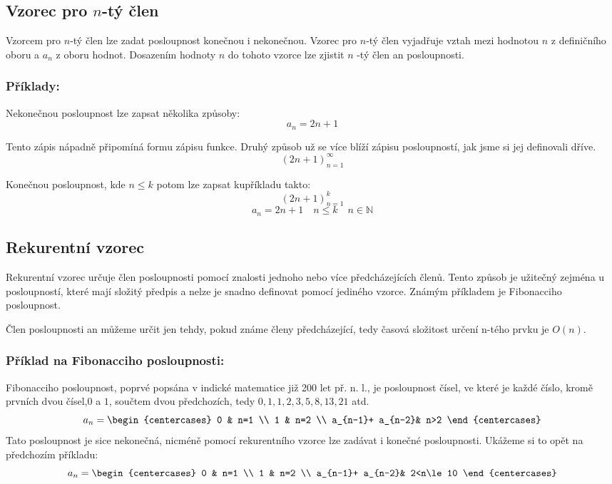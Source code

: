 \documentclass[12pt]{report}			%
\begin{document}
\subsection{Vzorec pro $n$-tý člen}
Vzorcem pro $n$-tý člen lze zadat posloupnost konečnou i nekonečnou.
Vzorec pro $n$-tý člen vyjadřuje vztah mezi hodnotou $n$ z definičního oboru a $a_n$ z oboru hodnot. Dosazením hodnoty $n$ do tohoto vzorce lze zjistit $n$ -tý člen an posloupnosti.
\subsubsection{Příklady:}
Nekonečnou posloupnost lze zapsat několika způsoby:
\[a_n = 2n + 1 \]

Tento zápis nápadně připomíná formu zápisu funkce. Druhý způsob už se více blíží zápisu posloupností, jak jsme si jej definovali dříve.
\[(2n + 1)_{n=1}^{\infty} \]

Konečnou posloupnost, kde $n \le k$ potom lze zapsat kupříkladu takto:
\[(2n + 1)_{n=1}^{k} \]
\[a_n = 2n + 1 \quad n \le k \quad n \in \mathbb{N}\]
\subsection{Rekurentní vzorec}
Rekurentní vzorec určuje člen posloupnosti pomocí znalosti jednoho nebo více předcházejících členů. Tento způsob je užitečný zejména u posloupností, které mají složitý předpis a nelze je snadno definovat pomocí jediného vzorce. Známým příkladem je Fibonacciho posloupnost.

Člen posloupnosti an můžeme určit jen tehdy, pokud známe členy předcházející, tedy časová složitost určení n-tého prvku je $O(n)$. 
\subsubsection{Příklad na Fibonacciho posloupnosti:}
Fibonacciho posloupnost, poprvé popsána v indické matematice již 200 let př. n. l., je posloupnost čísel, ve které je každé číslo, kromě prvních dvou čísel,$0$ a $1$, součtem dvou předchozích, tedy $0, 1, 1, 2, 3, 5, 8, 13, 21$ atd. 
\[
a_{n}=
\begin{centercases}
  0         & n=1 \\
  1 		   & n=2 \\
  a_{n-1}+ a_{n-2}& n>2
\end{centercases}
\]
Tato posloupnost je sice nekonečná, nicméně pomocí rekurentního vzorce lze zadávat i konečné posloupnosti. Ukážeme si to opět na předchozím příkladu:
\[
a_{n}=
\begin{centercases}
  0         & n=1 \\
  1 		   & n=2 \\
  a_{n-1}+ a_{n-2}& 2<n\le10
\end{centercases}
\]
\end{document}
